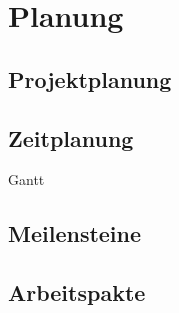 \chapter{Planung}
\section{Projektplanung}

\section{Zeitplanung}
Gantt
\section{Meilensteine}
\section{Arbeitspakte}

